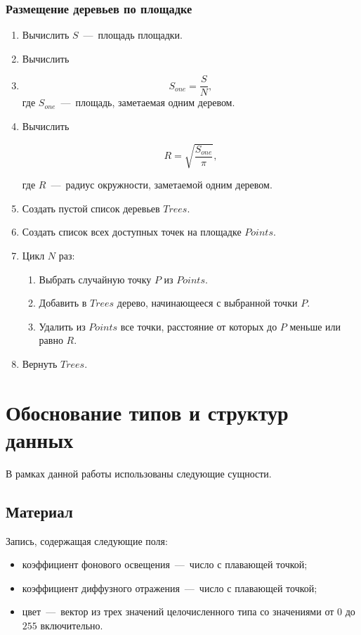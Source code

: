 \subsubsection{Размещение деревьев по площадке}
\begin{enumerate}
	\item Вычислить $S$~---~площадь площадки.
	\item Вычислить
	\item 
	\begin{equation}
		S_{one} = \frac{S}{N},
	\end{equation}
	где $S_{one}$~---~площадь, заметаемая одним деревом.
	
	\item Вычислить 
	
	\begin{equation}
		R = \sqrt{\frac{S_{one}}{\pi}},
	\end{equation}
	
	где $R$~---~радиус окружности, заметаемой одним деревом.
	
	\item Создать пустой список деревьев $Trees$.
	\item Создать список всех доступных точек на площадке $Points$.
	\item Цикл $N$ раз:
	\begin{enumerate}
		\item Выбрать случайную точку $P$ из $Points$.
		\item Добавить в $Trees$ дерево, начинающееся с выбранной точки $P$.
		\item Удалить из $Points$ все точки, расстояние от которых до $P$ меньше или равно $R$.
	\end{enumerate}
	
	\item Вернуть $Trees$.
\end{enumerate}

\section{Обоснование типов и структур данных}

В рамках данной работы использованы следующие сущности.

\subsection{Материал}
Запись, содержащая следующие поля:

\begin{itemize}
	\item коэффициент фонового освещения~---~число с плавающей точкой;
	\item коэффициент диффузного отражения~---~число с плавающей точкой;
	\item цвет~---~вектор из трех значений целочисленного типа со значениями от $0$ до $255$ включительно.
\end{itemize}

